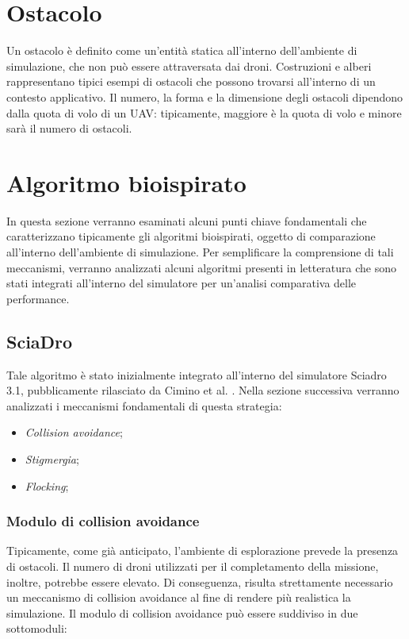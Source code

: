 \section{Ostacolo}

Un ostacolo è definito come un'entità statica all'interno dell'ambiente di simulazione, che non può essere attraversata dai droni.
Costruzioni e alberi rappresentano tipici esempi di ostacoli che possono trovarsi all'interno di un contesto applicativo.
Il numero, la forma e la dimensione degli ostacoli dipendono dalla quota di volo di un UAV: tipicamente, maggiore è la quota di volo e minore sarà il numero di ostacoli.

\section{Algoritmo bioispirato}

In questa sezione verranno esaminati alcuni punti chiave fondamentali che caratterizzano tipicamente gli algoritmi bioispirati, oggetto di comparazione all'interno dell'ambiente di simulazione.
Per semplificare la comprensione di tali meccanismi, verranno analizzati alcuni algoritmi presenti in letteratura che sono stati integrati all'interno del simulatore per un'analisi comparativa delle performance. 

\subsection{SciaDro}

Tale algoritmo è stato inizialmente integrato all'interno del simulatore Sciadro 3.1, pubblicamente rilasciato da Cimino et al. \cite{cimino2019adaptive}.
Nella sezione successiva verranno analizzati i meccanismi fondamentali di questa strategia:

\begin{itemize}
    \item \textit{Collision avoidance};
    \item \textit{Stigmergia};
    \item \textit{Flocking};
\end{itemize}

\subsubsection{Modulo di collision avoidance}

Tipicamente, come già anticipato, l’ambiente di esplorazione prevede la presenza di ostacoli. 
Il numero di droni utilizzati per il completamento della missione, inoltre, potrebbe essere elevato.
Di conseguenza, risulta strettamente necessario un meccanismo di collision avoidance al fine di rendere più realistica la simulazione. 
Il modulo di collision avoidance può essere suddiviso in due sottomoduli:


